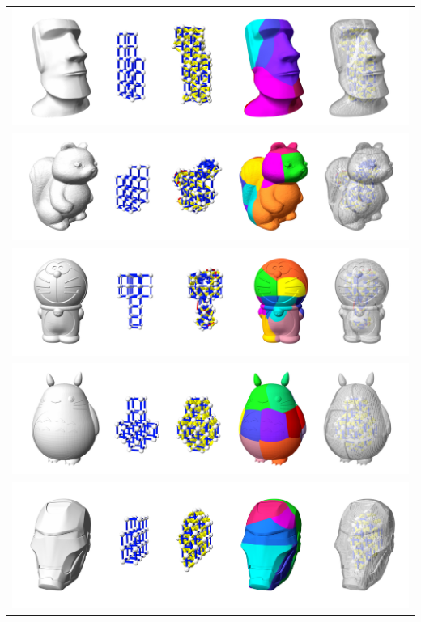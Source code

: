 \begin{table}[ht]
\centering
\resizebox{0.965\linewidth}{!} {
\begin{tabular}{c} 
\includegraphics{figs/MOAI.pdf} \\
\includegraphics{figs/Squirrel.pdf}\\
\includegraphics{figs/doraemon.pdf} \\
\includegraphics{figs/totoro.pdf}\\
\includegraphics{figs/iron.pdf}\\
\end{tabular}
}
\caption{}
\label{tab:result_ZomeFab_file_1}
\end{table}

